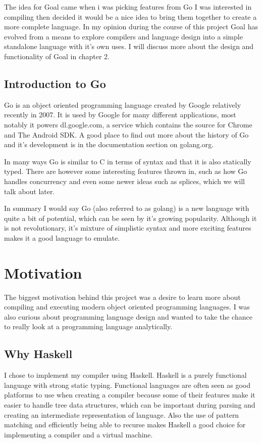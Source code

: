 The idea for Goal came when i was picking features from Go I was interested in compiling then decided it would be a nice idea to bring them together to create a more complete language. In my opinion during the course of this project Goal has evolved from a means to explore compilers and language design into a simple standalone language with it's own uses. I will discuss more about the design and functionality of Goal in chapter 2.


\subsection{Introduction to Go}

Go is an object oriented programming language created by Google relatively recently in 2007. It is used by Google for many different applications, most notably it powers dl.google.com, a service which contains the source for Chrome and The Android SDK. A good place to find out more about the history of Go and it's development is in the documentation section on golang.org.

In many ways Go is similar to C in terms of syntax and that it is also statically typed. There are however some interesting features thrown in, such as how Go handles concurrency and even some newer ideas such as splices, which we will talk about later.

In summary I would say Go (also referred to as golang) is a new language with quite a bit of potential, which can be seen by it's growing popularity. Although it is not revolutionary, it's mixture of simplistic syntax and more exciting features makes it a good language to emulate.

\section{Motivation}

The biggest motivation behind this project was a desire to learn more about compiling and executing modern object oriented programming languages. I was also curious about programming language design and wanted to take the chance to really look at a programming language analytically.

\subsection{Why Haskell}

I chose to implement my compiler using Haskell. Haskell is a purely functional language with strong static typing. Functional languages are often seen as good platforms to use when creating a compiler because some of their features make it easier to handle tree data structures, which can be important during parsing and creating an intermediate representation of language. Also the use of pattern matching and efficiently being able to recurse makes Haskell a good choice for implementing a compiler and a virtual machine.

